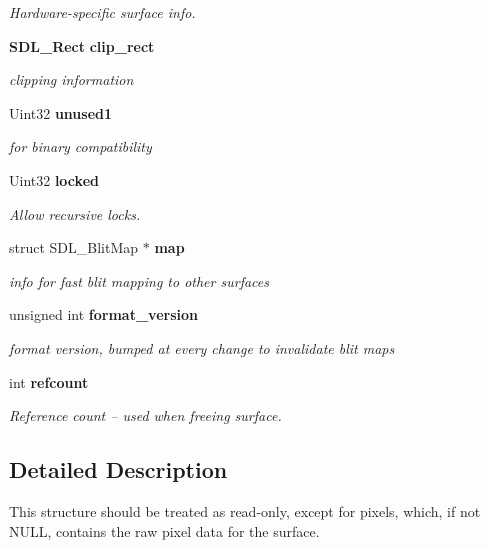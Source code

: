 \begin{DoxyCompactItemize}
\begin{DoxyCompactList}\small\item\em Hardware-\/specific surface info. \end{DoxyCompactList}\item 
{\bf S\+D\+L\+\_\+\+Rect} {\bf clip\+\_\+rect}
\begin{DoxyCompactList}\small\item\em clipping information \end{DoxyCompactList}\item 
Uint32 {\bf unused1}\label{struct_s_d_l___surface_a41066cf7cc91d2f032dd0f29cc418ec4}

\begin{DoxyCompactList}\small\item\em for binary compatibility \end{DoxyCompactList}\item 
Uint32 {\bf locked}
\begin{DoxyCompactList}\small\item\em Allow recursive locks. \end{DoxyCompactList}\item 
struct S\+D\+L\+\_\+\+Blit\+Map $\ast$ {\bf map}
\begin{DoxyCompactList}\small\item\em info for fast blit mapping to other surfaces \end{DoxyCompactList}\item 
unsigned int {\bf format\+\_\+version}
\begin{DoxyCompactList}\small\item\em format version, bumped at every change to invalidate blit maps \end{DoxyCompactList}\item 
int {\bf refcount}
\begin{DoxyCompactList}\small\item\em Reference count -- used when freeing surface. \end{DoxyCompactList}\end{DoxyCompactItemize}


\subsection{Detailed Description}
This structure should be treated as read-\/only, except for \textquotesingle{}pixels\textquotesingle{}, which, if not N\+U\+L\+L, contains the raw pixel data for the surface. 

